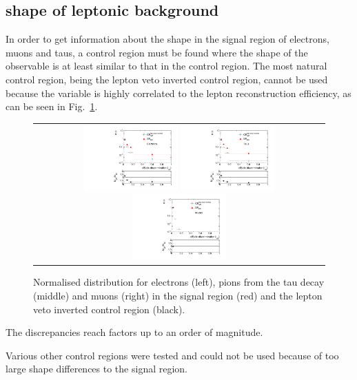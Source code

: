 \subsection*{\ias shape of leptonic background}
In order to get information about the \ias shape in the signal region of electrons, muons and taus, a control region must be found where the shape of the observable is at least similar to that in the control region.
The most natural control region, being the lepton veto inverted control region, cannot be used because the variable \ias is highly correlated to the lepton reconstruction efficiency, as can be seen in Fig.~\ref{fig:LeptonIasDist}.
\begin{figure}[!tb]
  \centering 
  \begin{tabular}{c}
    \includegraphics[width=0.33\textwidth]{figures/analysis/Background/hASmi_Electrons_MCCR_MCSR.pdf}
    \includegraphics[width=0.33\textwidth]{figures/analysis/Background/hASmi_Taus_MCCR_MCSR.pdf}
    \includegraphics[width=0.33\textwidth]{figures/analysis/Background/hASmi_Muons_MCCR_MCSR.pdf}
  \end{tabular}
  \caption{Normalised \ias distribution for electrons (left), pions from the tau decay (middle) and muons (right) in the signal region (red) and the lepton veto inverted control region (black).}
  \label{fig:LeptonIasDist}
\end{figure}
The discrepancies reach factors up to an order of magnitude.

Various other control regions were tested and could not be used because of too large \ias shape differences to the signal region.

